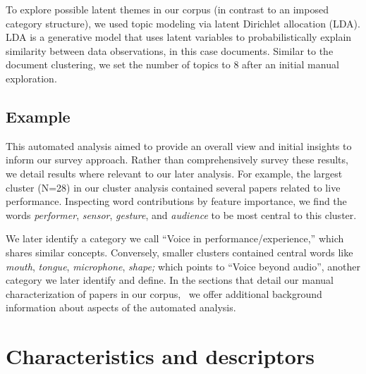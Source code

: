 \documentclass[sigconf]{nimeart}
\begin{document}
To explore possible latent themes in our corpus (in contrast to an imposed category structure), we used topic modeling via latent Dirichlet allocation (LDA). LDA is a generative model that uses latent variables to probabilistically explain similarity between data observations, in this case documents. Similar to the document clustering, we set the number of topics to 8 after an initial manual exploration.

\subsection{Example}\label{example}

This automated analysis aimed to provide an overall view and initial insights to inform our survey approach. Rather than comprehensively survey these results, we detail results where relevant to our later analysis. For example, the largest cluster (N=28) in our cluster analysis contained several papers related to live performance. Inspecting word contributions by feature importance, we find the words \emph{performer}, \emph{sensor}, \emph{gesture}, and \emph{audience} to be most central to this cluster.

We later identify a category we call ``Voice in performance/experience,'' which shares similar concepts. Conversely, smaller clusters contained central words like \emph{mouth}, \emph{tongue}, \emph{microphone}, \emph{shape;} which points to ``Voice beyond audio'', another category we later identify and define. In the sections that detail our manual characterization of papers in our corpus, ~we offer additional background information about aspects of the automated analysis.


\section{\texorpdfstring{\textbf{Characteristics and descriptors}}{Characteristics and descriptors}}\label{characteristics-and-descriptors}
\end{document}
